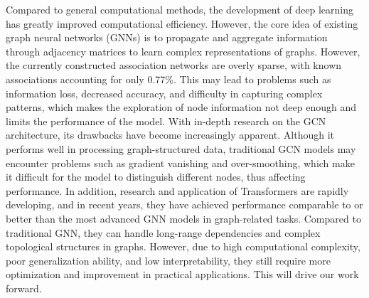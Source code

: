 \documentclass[a4paper,fleqn]{cas-dc}
\begin{document}
Compared to general computational methods, the development of deep learning has greatly improved computational efficiency.
However, the core idea of existing graph neural networks (GNNs) is to propagate and aggregate information through adjacency matrices to learn complex representations of graphs. 
However, the currently constructed association networks are overly sparse, with known associations accounting for only 0.77\%. This may lead to problems such as information loss, decreased accuracy, and difficulty in capturing complex patterns, which makes the exploration of node information not deep enough and limits the performance of the model. With in-depth research on the GCN architecture\cite{kipf2017semisupervisedclassificationgraphconvolutional}, its drawbacks have become increasingly apparent. Although it performs well in processing graph-structured data, traditional GCN models may encounter problems such as gradient vanishing and over-smoothing, which make it difficult for the model to distinguish different nodes, thus affecting performance.
In addition, research and application of Transformers\cite{vaswani2023attentionneed} are rapidly developing, and in recent years, they have achieved performance comparable to or better than the most advanced GNN models in graph-related tasks. Compared to traditional GNN, they can handle long-range dependencies and complex topological structures in graphs. However, due to high computational complexity, poor generalization ability, and low interpretability, they still require more optimization and improvement in practical applications. This will drive our work forward.
\end{document}
